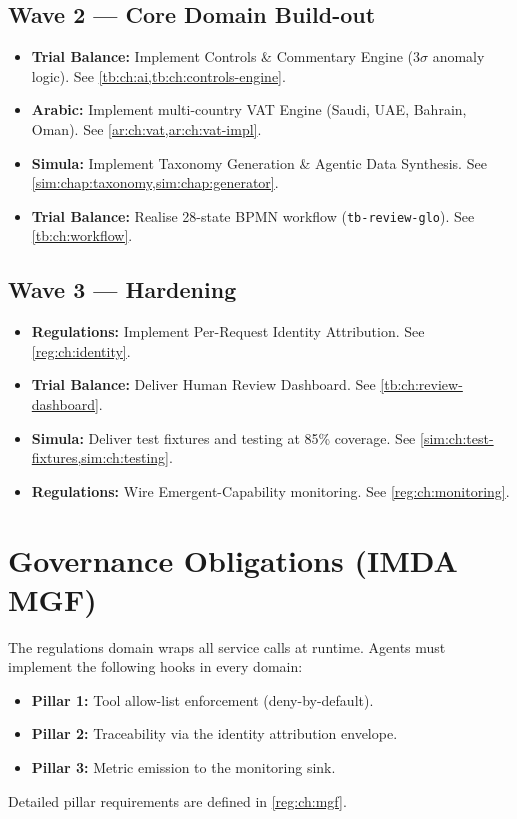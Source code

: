 \documentclass[11pt,a4paper,twoside]{report}
\begin{document}
\subsection*{Wave 2 --- Core Domain Build-out}
\begin{itemize}
\item \textbf{Trial Balance:} Implement Controls \& Commentary Engine (3$\sigma$ anomaly logic). See \cref{tb:ch:ai,tb:ch:controls-engine}.
\item \textbf{Arabic:} Implement multi-country VAT Engine (Saudi, UAE, Bahrain, Oman). See \cref{ar:ch:vat,ar:ch:vat-impl}.
\item \textbf{Simula:} Implement Taxonomy Generation \& Agentic Data Synthesis. See \cref{sim:chap:taxonomy,sim:chap:generator}.
\item \textbf{Trial Balance:} Realise 28-state BPMN workflow (\texttt{tb-review-glo}). See \cref{tb:ch:workflow}.
\end{itemize}

\subsection*{Wave 3 --- Hardening}
\begin{itemize}
\item \textbf{Regulations:} Implement Per-Request Identity Attribution. See \cref{reg:ch:identity}.
\item \textbf{Trial Balance:} Deliver Human Review Dashboard. See \cref{tb:ch:review-dashboard}.
\item \textbf{Simula:} Deliver test fixtures and testing at 85\% coverage. See \cref{sim:ch:test-fixtures,sim:ch:testing}.
\item \textbf{Regulations:} Wire Emergent-Capability monitoring. See \cref{reg:ch:monitoring}.
\end{itemize}

\section{Governance Obligations (IMDA MGF)}
The regulations domain wraps all service calls at runtime. Agents must implement the following hooks in every domain:
\begin{itemize}
\item \textbf{Pillar 1:} Tool allow-list enforcement (deny-by-default).
\item \textbf{Pillar 2:} Traceability via the identity attribution envelope.
\item \textbf{Pillar 3:} Metric emission to the monitoring sink.
\end{itemize}
Detailed pillar requirements are defined in \cref{reg:ch:mgf}.
\end{document}
